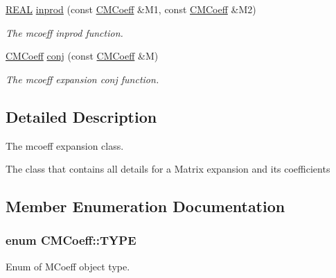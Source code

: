 \begin{DoxyCompactItemize}
\hyperlink{util_8h_a5821460e95a0800cf9f24c38915cbbde}{R\-E\-A\-L} \hyperlink{classCMCoeff_a90c84c259a220e291cebf52d99560c61}{inprod} (const \hyperlink{classCMCoeff}{C\-M\-Coeff} \&M1, const \hyperlink{classCMCoeff}{C\-M\-Coeff} \&M2)
\begin{DoxyCompactList}\small\item\em The mcoeff inprod function. \end{DoxyCompactList}\item 
\hyperlink{classCMCoeff}{C\-M\-Coeff} \hyperlink{classCMCoeff_a33f855dbf0c86d35853f618e3494db87}{conj} (const \hyperlink{classCMCoeff}{C\-M\-Coeff} \&M)
\begin{DoxyCompactList}\small\item\em The mcoeff expansion conj function. \end{DoxyCompactList}\end{DoxyCompactItemize}


\subsection{Detailed Description}
The mcoeff expansion class. 

The class that contains all details for a Matrix expansion and its coefficients 

\subsection{Member Enumeration Documentation}
\hypertarget{classCMCoeff_a0b490eeb5ba86bc1a95ea1c3b2946478}{
\subsubsection[{T\-Y\-P\-E}]{\setlength{\rightskip}{0pt plus 5cm}enum {\bf C\-M\-Coeff\-::\-T\-Y\-P\-E}}}\label{classCMCoeff_a0b490eeb5ba86bc1a95ea1c3b2946478}


Enum of M\-Coeff object type. 

